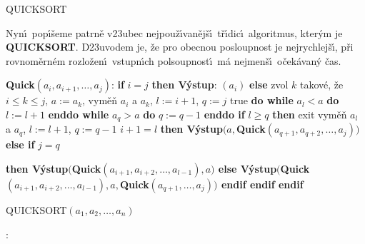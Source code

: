 \head
QUICKSORT
\endhead

\flushpar Nyn\'\i\ pop\'\i\v seme patrn\v e v\accent23ubec 
nejpou\v z\'\i van\v ej\v s\'\i\ t\v r\'\i dic\'\i\ algoritmus, kter\'ym je {\bf QUICKSORT}. 
D\accent23uvodem je, \v ze pro obecnou posloupnost je 
nejrychlej\v s\'\i , p\v ri rovnom\v ern\'em rozlo\v zen\'\i\ vstupn\'\i ch 
polsoupnost\'\i\ m\'a nejmen\v s\'\i\ o\v cek\'avan\'y \v cas. 
\bigskip

{\bf Quick$(a_i,a_{i+1},\dots,a_j)$}:\newline 
{\bf if} $i=j$ {\bf then\newline 
\phantom{{\rm ---}}V\'ystup}: $(a_i)$\newline 
{\bf else\newline 
\phantom{{\rm ---}}}zvol $k$ takov\'e, \v ze $i\le k\le j$, $a:=a_k$, 
vym\v e\v n $a_i$ a $a_k$, $l:=i+1$, $q:=j$\newline 
\phantom{---}{\bf while} true {\bf do\newline 
\phantom{{\rm ------}}while} $a_l<a$ {\bf do} $l:=l+1$ {\bf enddo\newline 
\phantom{{\rm ------}}while} $a_q>a$ {\bf do} $q:=q-1$ {\bf enddo\newline 
\phantom{{\rm ------}}if} $l\ge q$ {\bf then\newline 
\phantom{{\rm ---------}}}exit\newline 
{}vym\v e\v n $a_l$ a $a_q$, $l:=l+1$, $q
:=q-1$\newline 
{} $i+1=l$ {\bf then\newline 
\phantom{{\rm ------}}V\'ystup$(a,$Quick$(a_{q+1},a_{q+2},\dots,a_
j))$\newline 
\phantom{{\rm ---}}else\newline 
\phantom{{\rm ------}}if} $j=q$ {\bf then\newline 
\phantom{{\rm ---------}}V\'ystup$($Quick$(a_{i+1},a_{i+2},\dots,
a_{l-1}),a)$\newline 
\phantom{{\rm ------}}else\newline 
\phantom{{\rm ---------}}V\'ystup$($Quick$(a_{i+1},a_{i+2},\dots,
a_{l-1}),a,$Quick$(a_{q+1},\dots,a_j))$\newline 
\phantom{{\rm ------}}endif\newline 
\phantom{{\rm ---}}endif\newline 
endif
\bigskip

QUICKSORT$(a_1,a_2,\dots,a_n)$}:\newline 
